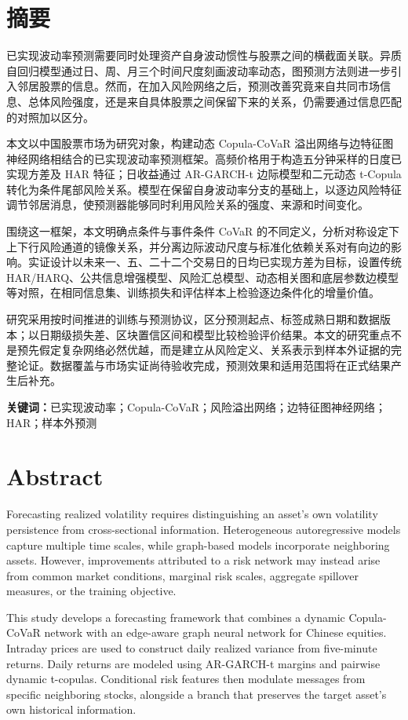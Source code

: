\documentclass[UTF8,zihao=-4,oneside,openany,fontset=fandol]{ctexbook}
\numberwithin{equation}{chapter}
\begin{document}
\chapter*{摘\quad 要}
已实现波动率预测需要同时处理资产自身波动惯性与股票之间的横截面关联。异质自回归模型通过日、周、月三个时间尺度刻画波动率动态，图预测方法则进一步引入邻居股票的信息。然而，在加入风险网络之后，预测改善究竟来自共同市场信息、总体风险强度，还是来自具体股票之间保留下来的关系，仍需要通过信息匹配的对照加以区分。

本文以中国股票市场为研究对象，构建动态 Copula-CoVaR 溢出网络与边特征图神经网络相结合的已实现波动率预测框架。高频价格用于构造五分钟采样的日度已实现方差及 HAR 特征；日收益通过 AR-GARCH-t 边际模型和二元动态 t-Copula 转化为条件尾部风险关系。模型在保留自身波动率分支的基础上，以逐边风险特征调节邻居消息，使预测器能够同时利用风险关系的强度、来源和时间变化。

围绕这一框架，本文明确点条件与事件条件 CoVaR 的不同定义，分析对称设定下上下行风险通道的镜像关系，并分离边际波动尺度与标准化依赖关系对有向边的影响。实证设计以未来一、五、二十二个交易日的日均已实现方差为目标，设置传统 HAR/HARQ、公共信息增强模型、风险汇总模型、动态相关图和底层参数边模型等对照，在相同信息集、训练损失和评估样本上检验逐边条件化的增量价值。

研究采用按时间推进的训练与预测协议，区分预测起点、标签成熟日期和数据版本；以日期级损失差、区块置信区间和模型比较检验评价结果。本文的研究重点不是预先假定复杂网络必然优越，而是建立从风险定义、关系表示到样本外证据的完整论证。数据覆盖与市场实证尚待验收完成，预测效果和适用范围将在正式结果产生后补充。

\noindent\textbf{关键词：}已实现波动率；Copula-CoVaR；风险溢出网络；边特征图神经网络；HAR；样本外预测

\chapter*{Abstract}
Forecasting realized volatility requires distinguishing an asset's own volatility persistence from cross-sectional information. Heterogeneous autoregressive models capture multiple time scales, while graph-based models incorporate neighboring assets. However, improvements attributed to a risk network may instead arise from common market conditions, marginal risk scales, aggregate spillover measures, or the training objective.

This study develops a forecasting framework that combines a dynamic Copula-CoVaR network with an edge-aware graph neural network for Chinese equities. Intraday prices are used to construct daily realized variance from five-minute returns. Daily returns are modeled using AR-GARCH-t margins and pairwise dynamic t-copulas. Conditional risk features then modulate messages from specific neighboring stocks, alongside a branch that preserves the target asset's own historical information.
\end{document}
